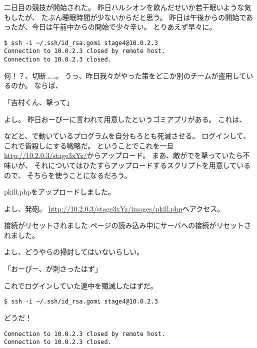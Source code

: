 二日目の競技が開始された。
昨日ハルシオンを飲んだせいか若干眠いような気もしたが、
たぶん睡眠時間が少ないからだと思う。
昨日は午後からの開始であったが、今日は午前中からの開始で少々辛い。
とりあえず早々に。

\begin{lstlisting}
$ ssh -i ~/.ssh/id_rsa.gomi stage4@10.0.2.3
Connection to 10.0.2.3 closed by remote host.
Connection to 10.0.2.3 closed.
\end{lstlisting}

何！？、切断……。
うっ、昨日我々がやった策をどこか別のチームが盗用しているのか。
ならば、

「吉村くん、撃って」

よし。
昨日おーぴーに言われて用意したというゴミアプリがある。
これは、



などと、で動いているプログラムを自分もろとも死滅させる。
ログインして、これで皆殺しにする戦略だ。
ということでこれを一旦\url{http://10.2.0.3/stage3xYz/}からアップロード。
まあ、敵がでを撃っていたら不味いが、
それについてはひたすらアップロードするスクリプトを用意しているので、
そちらを使うことになるだろう。

\begin{screen}
\centering
pkill.phpをアップロードしました。
\end{screen}

よし、発砲。
\url{http://10.2.0.3/stage3xYz/images/pkill.php}へアクセス。

\begin{itembox}[c]{接続がリセットされました}
ページの読み込み中にサーバへの接続がリセットされました。
\end{itembox}

よし、どうやらの掃討してはいないらしい。

「おーぴー、が刺さったはず」

これでログインしていた連中を殲滅したはずだ。

\begin{lstlisting}
$ ssh -i ~/.ssh/id_rsa.gomi stage4@10.0.2.3
\end{lstlisting}

どうだ！

\begin{lstlisting}
Connection to 10.0.2.3 closed by remote host.
Connection to 10.0.2.3 closed.
\end{lstlisting}

